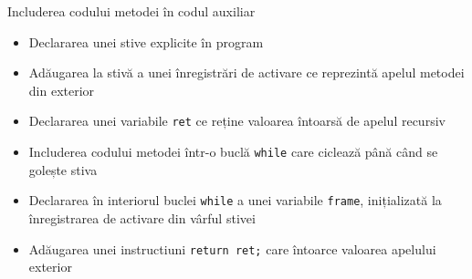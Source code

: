 \documentclass{beamer}
\def\code#1{\texttt{#1}}
\begin{document}
\begin{frame}{Includerea codului metodei în codul auxiliar}
    \begin{itemize}
        \item Declararea unei stive explicite în program
        \item Adăugarea la stivă a unei înregistrări de activare ce reprezintă apelul metodei din exterior
        \item Declararea unei variabile \code{ret} ce reține valoarea întoarsă de apelul recursiv
        \item Includerea codului metodei într-o buclă \code{while} care ciclează până când se golește stiva
        \item Declararea în interiorul buclei \code{while} a unei variabile \code{frame}, inițializată la înregistrarea
        de activare din vârful stivei
        \item Adăugarea unei instructiuni \code{return ret;} care întoarce valoarea apelului exterior
    \end{itemize}
\end{frame}
\end{document}

